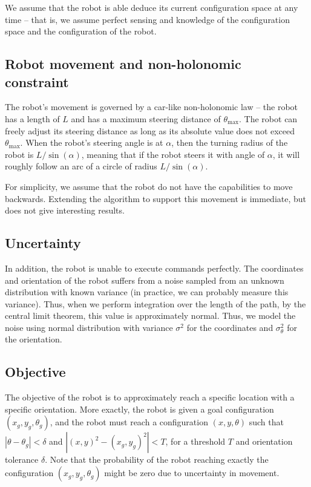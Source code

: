 \documentclass[a4paper]{article}
\begin{document}
We assume that the robot is able deduce its current configuration space at
any time -- that is, we assume perfect sensing and knowledge of the configuration space
and the configuration of the robot.

\subsection{Robot movement and non-holonomic constraint}
The robot's movement is governed by a car-like non-holonomic law -- the robot
has a length of $L$ and has a maximum steering distance of $\theta_{\text{max}}$.
The robot can freely adjust its steering distance as long as its absolute
value does not exceed $\theta_{\text{max}}$.  When the
robot's steering angle is at $\alpha$, then the turning radius of the robot
is $L / \sin(\alpha)$, meaning that if the robot steers it with angle of $\alpha$,
it will roughly follow an arc of a circle of radius $L / \sin(\alpha)$.

For simplicity, we assume that the robot do not have the capabilities to move
backwards. Extending the algorithm to support this movement is immediate, but
does not give interesting results.

\subsection{Uncertainty}
In addition, the robot is unable to execute commands perfectly. The coordinates
and orientation of the robot suffers from a noise sampled from an unknown distribution
with known variance (in practice, we can probably measure this variance).
Thus, when we perform integration over the length of the path, by the central
limit theorem, this value is approximately normal. Thus, we model the noise
using normal distribution with variance $\sigma^2$ for the coordinates and
$\sigma_\theta^2$ for the orientation.

\subsection{Objective}
The objective of the robot is to approximately reach a specific location with a
specific orientation. More exactly, the robot is given a goal configuration
$(x_g, y_g, \theta_g)$, and the robot must reach a configuration $(x, y, \theta)$
such that $|\theta - \theta_g| < \delta$ and $|(x, y)^2 - (x_g, y_g)^2| < T$,
for a threshold $T$ and orientation tolerance $\delta$. Note that the probability
of the robot reaching exactly the configuration $(x_g, y_g, \theta_g)$ might be
zero due to uncertainty in movement.
\end{document}

